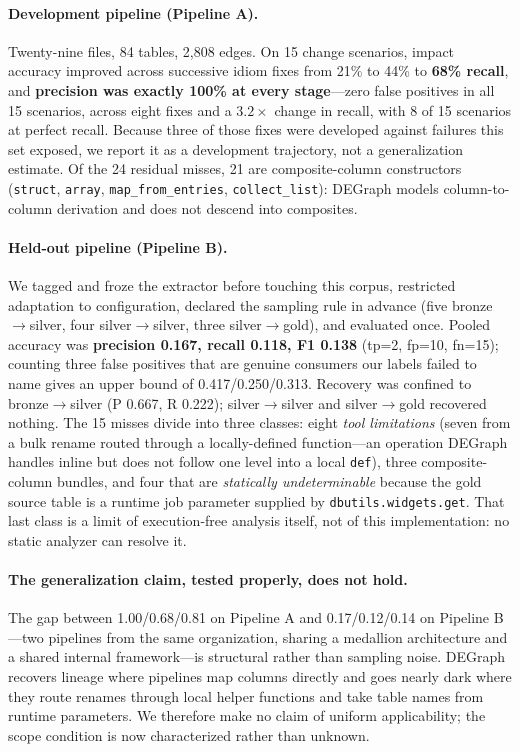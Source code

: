 \documentclass[11pt]{article}
\newcommand{\code}[1]{\texttt{#1}}
\begin{document}
\paragraph{Development pipeline (Pipeline A).} Twenty-nine files, 84 tables, 2{,}808
edges. On 15 change scenarios, impact accuracy improved across successive idiom
fixes from 21\% to 44\% to \textbf{68\% recall}, and \textbf{precision was exactly
100\% at every stage}---zero false positives in all 15 scenarios, across eight fixes
and a $3.2\times$ change in recall, with 8 of 15 scenarios at perfect recall. Because
three of those fixes were developed against failures this set exposed, we report it
as a development trajectory, not a generalization estimate. Of the 24 residual
misses, 21 are composite-column constructors (\code{struct}, \code{array},
\code{map\_from\_entries}, \code{collect\_list}): DEGraph models column-to-column
derivation and does not descend into composites.

\paragraph{Held-out pipeline (Pipeline B).} We tagged and froze the extractor before
touching this corpus, restricted adaptation to configuration, declared the sampling
rule in advance (five bronze$\rightarrow$silver, four silver$\rightarrow$silver,
three silver$\rightarrow$gold), and evaluated once. Pooled accuracy was
\textbf{precision 0.167, recall 0.118, F1 0.138} (tp=2, fp=10, fn=15); counting three
false positives that are genuine consumers our labels failed to name gives an upper
bound of 0.417/0.250/0.313. Recovery was confined to bronze$\rightarrow$silver
(P 0.667, R 0.222); silver$\rightarrow$silver and silver$\rightarrow$gold recovered
nothing. The 15 misses divide into three classes: eight \emph{tool limitations}
(seven from a bulk rename routed through a locally-defined function---an operation
DEGraph handles inline but does not follow one level into a local \code{def}), three
composite-column bundles, and four that are \emph{statically undeterminable} because
the gold source table is a runtime job parameter supplied by
\code{dbutils.\allowbreak widgets.\allowbreak get}. That last class is a limit of execution-free analysis
itself, not of this implementation: no static analyzer can resolve it.

\paragraph{The generalization claim, tested properly, does not hold.} The gap between
1.00/0.68/0.81 on Pipeline A and 0.17/0.12/0.14 on Pipeline B---two pipelines from the same
organization, sharing a medallion architecture and a shared internal framework---is
structural rather than sampling noise. DEGraph recovers lineage where pipelines map
columns directly and goes nearly dark where they route renames through local helper
functions and take table names from runtime parameters. We therefore make no claim of
uniform applicability; the scope condition is now characterized rather than unknown.
\end{document}
